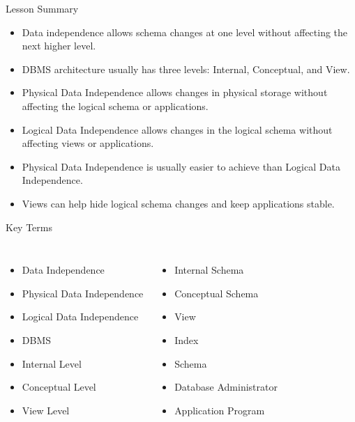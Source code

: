 \documentclass[aspectratio=169,11pt]{beamer}
\begin{document}
\begin{frame}{Lesson Summary}
\begin{itemize}
  \item Data independence allows schema changes at one level without affecting the next higher level.
  \item DBMS architecture usually has three levels: Internal, Conceptual, and View.
  \item Physical Data Independence allows changes in physical storage without affecting the logical schema or applications.
  \item Logical Data Independence allows changes in the logical schema without affecting views or applications.
  \item Physical Data Independence is usually easier to achieve than Logical Data Independence.
  \item Views can help hide logical schema changes and keep applications stable.
\end{itemize}
\end{frame}

\begin{frame}{Key Terms}
\begin{columns}[T]
\begin{itemize}
  \item Data Independence
  \item Physical Data Independence
  \item Logical Data Independence
  \item DBMS
  \item Internal Level
  \item Conceptual Level
  \item View Level
\end{itemize}

\begin{itemize}
  \item Internal Schema
  \item Conceptual Schema
  \item View
  \item Index
  \item Schema
  \item Database Administrator
  \item Application Program
\end{itemize}
\end{columns}
\end{frame}
\end{document}
